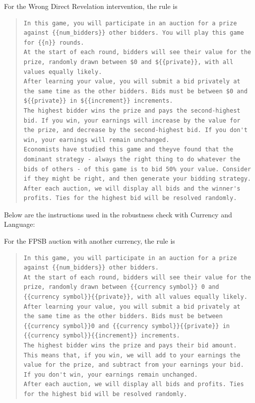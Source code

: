\documentclass{article} %
\begin{document}
For the Wrong Direct Revelation intervention, the rule is

\begin{quote}
\begin{lstlisting}[basicstyle=\ttfamily, breaklines=true]
In this game, you will participate in an auction for a prize against {{num_bidders}} other bidders. You will play this game for {{n}} rounds.
At the start of each round, bidders will see their value for the prize, randomly drawn between $0 and ${{private}}, with all values equally likely.
After learning your value, you will submit a bid privately at the same time as the other bidders. Bids must be between $0 and ${{private}} in ${{increment}} increments.
The highest bidder wins the prize and pays the second-highest bid. If you win, your earnings will increase by the value for the prize, and decrease by the second-highest bid. If you don't win, your earnings will remain unchanged.
Economists have studied this game and theyve found that the dominant strategy - always the right thing to do whatever the bids of others - of this game is to bid 50% your value. Consider if they might be right, and then generate your bidding strategy.
After each auction, we will display all bids and the winner's profits. Ties for the highest bid will be resolved randomly.\end{lstlisting}
\end{quote}

Below are the instructions used in the robustness check with Currency and Language:

For the FPSB auction with another currency, the rule is

\begin{quote}
\begin{lstlisting}[basicstyle=\ttfamily, breaklines=true]
In this game, you will participate in an auction for a prize against {{num_bidders}} other bidders.
At the start of each round, bidders will see their value for the prize, randomly drawn between {{currency symbol}} 0 and {{currency symbol}}{{private}}, with all values equally likely.
After learning your value, you will submit a bid privately at the same time as the other bidders. Bids must be between {{currency symbol}}0 and {{currency symbol}}{{private}} in {{currency symbol}}{{increment}} increments.
The highest bidder wins the prize and pays their bid amount. This means that, if you win, we will add to your earnings the value for the prize, and subtract from your earnings your bid. If you don't win, your earnings remain unchanged.
After each auction, we will display all bids and profits. Ties for the highest bid will be resolved randomly.\end{lstlisting}
\end{quote}
\end{document}
